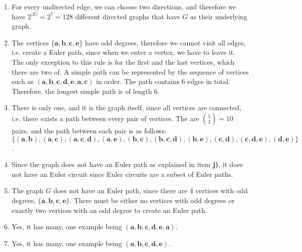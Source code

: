\documentclass[12pt]{article}
\begin{document}
\begin{enumerate}
\item
For every undirected edge, we can choose two directions, and therefore we have $2^{|E|} = 2^7 = 128$ different directed graphs that have $G$ as their underlying graph.

\newpage

\item
The vertices $\{\textbf{a}, \textbf{b}, \textbf{c}, \textbf{e}\}$ have odd degrees, therefore we cannot visit all edges, i.e. create a Euler path, since when we enter a vertex, we have to leave it.
The only exception to this rule is for the first and the last vertices, which there are two of.
A simple path can be represented by the sequence of vertices such as $(\textbf{a}, \textbf{b}, \textbf{c}, \textbf{d}, \textbf{e}, \textbf{a}, \textbf{c})$ in order.
The path contains 6 edges in total.
Therefore, the longest simple path is of length 6.

\item
There is only one, and it is the graph itself, since all vertices are connected, i.e. there exists a path between every pair of vertices.
The are $\binom{5}{2} = 10$ pairs, and the path between each pair is as follows: $\{(\textbf{a}, \textbf{b}), (\textbf{a}, \textbf{c}), (\textbf{a}, \textbf{c}, \textbf{d}), (\textbf{a}, \textbf{e}), (\textbf{b}, \textbf{c}), (\textbf{b}, \textbf{c}, \textbf{d}), (\textbf{b}, \textbf{e}), (\textbf{c}, \textbf{d}), (\textbf{c}, \textbf{d}, \textbf{e}), (\textbf{d}, \textbf{e})\}$.

\item
Since the graph does not have an Euler path as explained in item \textbf{j)}, it does not have an Euler circuit since Euler circuits are a subset of Euler paths.

\item
The graph $G$ does not have an Euler path, since there are 4 vertices with odd degrees, $\{\textbf{a}, \textbf{b}, \textbf{c}, \textbf{e}\}$.
There must be either no vertices with odd degrees or exactly two vertices with an odd degree to create an Euler path.

\item
Yes, it has many, one example being $(\textbf{a}, \textbf{b}, \textbf{c}, \textbf{d}, \textbf{e}, \textbf{a})$.

\item
Yes, it has many, one example being $(\textbf{a}, \textbf{b}, \textbf{c}, \textbf{d}, \textbf{e})$.

\end{enumerate}
\end{document}
